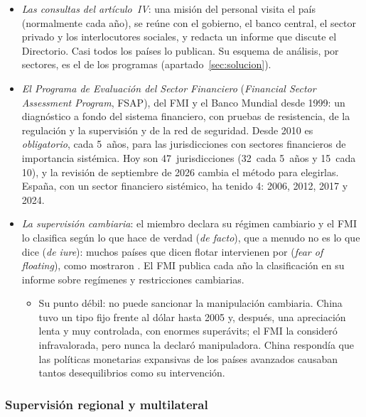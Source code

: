 \documentclass[11pt]{article}
\begin{document}
\begin{itemize}
\item \emph{Las consultas del artículo~IV}: una misión del personal visita el país (normalmente cada año), se reúne con el gobierno, el banco central, el sector privado y los interlocutores sociales, y redacta un informe que discute el Directorio. Casi todos los países lo publican. Su esquema de análisis, por sectores, es el de los programas (apartado~\ref{sec:solucion}).
\item \emph{El Programa de Evaluación del Sector Financiero} (\emph{Financial Sector Assessment Program}, FSAP), del FMI y el Banco Mundial desde 1999: un diagnóstico a fondo del sistema financiero, con pruebas de resistencia, de la regulación y la supervisión y de la red de seguridad. Desde 2010 es \emph{obligatorio}, cada 5~años, para las jurisdicciones con sectores financieros de importancia sistémica. Hoy son 47~jurisdicciones (32~cada 5~años y 15~cada 10), y la revisión de septiembre de 2026 cambia el método para elegirlas\nocite{FMI2026FSAPRevision}. España, con un sector financiero sistémico, ha tenido 4: 2006, 2012, 2017 y 2024\nocite{FMI2024FSAPEspana}.
\item \emph{La supervisión cambiaria}: el miembro declara su régimen cambiario y el FMI lo clasifica según lo que hace de verdad (\emph{de facto}), que a menudo no es lo que dice (\emph{de iure}): muchos países que dicen flotar intervienen por  (\emph{fear of floating}), como mostraron \textcite{CalvoReinhart2002} . El FMI publica cada año la clasificación en su informe sobre regímenes y restricciones cambiarias.
  \begin{itemize}
  \item Su punto débil: no puede sancionar la manipulación cambiaria. China tuvo un tipo fijo frente al dólar hasta 2005 y, después, una apreciación lenta y muy controlada, con enormes superávits; el FMI la consideró infravalorada, pero nunca la declaró manipuladora. China respondía que las políticas monetarias expansivas de los países avanzados causaban tantos desequilibrios como su intervención.
  \end{itemize}
\end{itemize}

\subsubsection{Supervisión regional y multilateral}\label{sec:multilateral}
\end{document}
